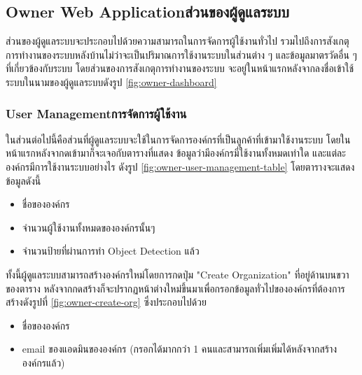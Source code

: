\subsection{\ifenglish Owner Web Application\else ส่วนของผู้ดูแลระบบ\fi}
\ifenglish \else
ส่วนของผู้ดูแลระบบจะประกอบไปด้วยความสามารถในการจัดการผู้ใช้งานทั่วไป รวมไปถึงการสังเกตุการทำงานของระบบหลังบ้านไม่ว่าจะเป็นปริมาณการใช้งานระบบในส่วนต่าง ๆ และข้อมูลมาตรวัดอื่น ๆ ที่เกี่ยวข้องกับระบบ
โดยส่วนของการสังเกตุการทำงานของระบบ จะอยู่ในหน้าแรกหลังจากลงชื่อเข้าใช้ระบบในนามของผู้ดูแลระบบดังรูป \ref{fig:owner-dashboard}
\fi


\subsubsection{\ifenglish User Management\else การจัดการผู้ใช้งาน\fi}
\ifenglish \else
ในส่วนต่อไปนี้คือส่วนที่ผู้ดูแลระบบจะใช้ในการจัดการองค์กรที่เป็นลูกค้าที่เข้ามาใช้งานระบบ โดยในหน้าแรกหลังจากดเข้ามาก็จะเจอกับตารางที่แสดง ข้อมูลว่ามีองค์กรมี่ใช้งานทั้งหมดเท่าใด และแต่ละองค์กรมีการใช้งานระบบอย่างไร ดังรูป \ref{fig:owner-user-management-table} โดยตารางจะแสดงข้อมูลดังนี้ 
\begin{itemize}
    \item ชื่อขององค์กร
    \item จำนวนผู้ใช้งานทั้งหมดขององค์กรนั้นๆ
    \item จำนวนป้ายที่ผ่านการทำ Object Detection แล้ว
\end{itemize}

ทั้งนี้ผู้ดูแลระบบสามารถสร้างองค์กรใหม่โดยการกดปุ่ม "Create Organization" ที่อยู่ด้านบนขวาของตาราง หลังจากกดสร้างก็จะปรากฏหน้าต่างใหม่ขึ้นมาเพื่อกรอกข้อมูลทั่วไปขององค์กรที่ต้องการสร้างดังรูปที่ \ref{fig:owner-create-org} ซึ่งประกอบไปด้วย
\begin{itemize}
    \item ชื่อขององค์กร
    \item email ของแอดมินขององค์กร (กรอกได้มากกว่า 1 คนและสามารถเพิ่มเพิ่มได้หลังจากสร้างองค์กรแล้ว)
\end{itemize}


